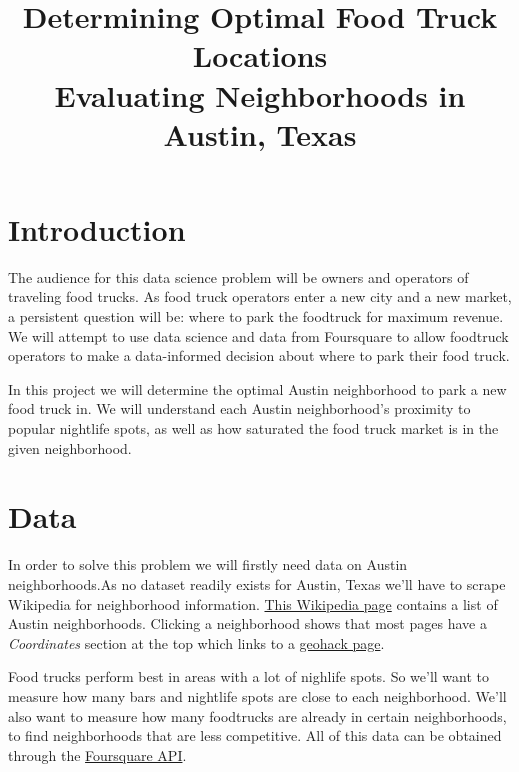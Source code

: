 \documentclass{deagle}
\title{Determining Optimal Food Truck Locations \\ \Large Evaluating Neighborhoods in Austin, Texas}
\begin{document}
\maketitle


\section*{Introduction}

The audience for this data science problem will be owners and operators of traveling food trucks. As food truck operators enter a new city and a new market, a persistent question will be: where to park the foodtruck for maximum revenue. We will attempt to use data science and data from Foursquare to allow foodtruck operators to make a data-informed decision about where to park their food truck.

In this project we will determine the optimal Austin neighborhood to park a new food truck in. We will understand each Austin neighborhood's proximity to popular nightlife spots, as well as how saturated the food truck market is in the given neighborhood.

\section*{Data}

In order to solve this problem we will firstly need data on Austin neighborhoods.As no dataset readily exists for Austin, Texas we'll have to scrape Wikipedia for neighborhood information. \href{https://en.wikipedia.org/wiki/Category:Neighborhoods_in_Austin,_Texas}{This Wikipedia page} contains a list of Austin neighborhoods. Clicking a neighborhood shows that most pages have a \emph{Coordinates} section at the top which links to a \href{https://geohack.toolforge.org/geohack.php?pagename=Anderson_Mill,_Austin,_Texas&params=30_27_18_N_97_48_33_W_region:US-TX_type:city(8953)}{geohack page}.

Food trucks perform best in areas with a lot of nighlife spots. So we'll want to measure how many bars and nightlife spots are close to each neighborhood. We'll also want to measure how many foodtrucks are already in certain neighborhoods, to find neighborhoods that are less competitive. All of this data can be obtained through the \href{https://foursquare.com/developers/apps}{Foursquare API}.
\end{document}
